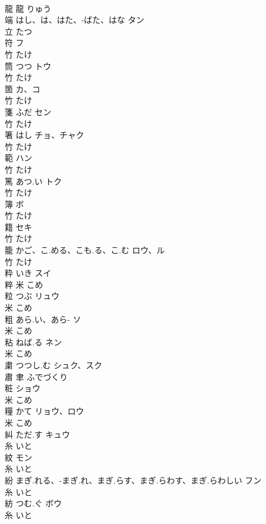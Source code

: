 \documentclass[8pt]{extreport}
\begin{document}
\begin{CJK}{UTF8}{min}
\\	龍	龍		りゅう		
\\	端	はし、は、はた、-ばた、はな	タン	
\\	立		たつ		
\\	符		フ	
\\	竹		たけ		
\\	筒	つつ	トウ	
\\	竹		たけ		
\\	箇		カ、コ	
\\	竹		たけ		
\\	箋	ふだ	セン	
\\	竹		たけ		
\\	箸	はし	チョ、チャク	
\\	竹		たけ		
\\	範		ハン	
\\	竹		たけ		
\\	篤	あつ.い	トク	
\\	竹		たけ		
\\	簿		ボ	
\\	竹		たけ		
\\	籍		セキ	
\\	竹		たけ		
\\	籠	かご、こ.める、こも.る、こ.む	ロウ、ル	
\\	竹		たけ		
\\	粋	いき	スイ	
\\	粹	米		こめ		
\\	粒	つぶ	リュウ	
\\	米		こめ		
\\	粗	あら.い、あら-	ソ	
\\	米		こめ		
\\	粘	ねば.る	ネン	
\\	米		こめ		
\\	粛	つつし.む	シュク、スク	
\\	肅	聿		ふでづくり		
\\	粧		ショウ	
\\	米		こめ		
\\	糧	かて	リョウ、ロウ	
\\	米		こめ		
\\	糾	ただ.す	キュウ	
\\	糸		いと		
\\	紋		モン	
\\	糸		いと		
\\	紛	まぎ.れる、-まぎ.れ、まぎ.らす、まぎ.らわす、まぎ.らわしい	フン	
\\	糸		いと		
\\	紡	つむ.ぐ	ボウ	
\\	糸		いと		

\end{CJK}
\end{document}
